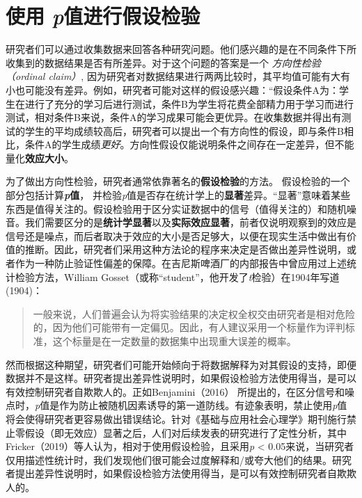 \documentclass[
  letterpaper,
  DIV=11,
  numbers=noendperiod]{scrreprt}
\begin{document}
\hypertarget{sec-pvalue}{%
\chapter{\texorpdfstring{使用
\emph{p}值进行假设检验}{使用 p值进行假设检验}}\label{sec-pvalue}}

研究者们可以通过收集数据来回答各种研究问题。他们感兴趣的是在不同条件下所收集到的数据结果是否有所差异。对于这个问题的答案是一个
\emph{方向性检验（ordinal claim）},
因为研究者对数据结果进行两两比较时，其平均值可能有大有小也可能没有差异。例如，研究者可能对这样的假设感兴趣：``假设条件A为：学生在进行了充分的学习后进行测试，条件B为学生将花费全部精力用于学习而进行测试，相对条件B来说，条件A的学习成果可能会更优异。在收集数据并得出有测试的学生的平均成绩较高后，研究者可以提出一个有方向性的假设，即与条件B相比，条件A的学生成绩\emph{更好}。方向性假设仅能说明条件之间存在一定差异，但不能量化\textbf{效应大小}。

为了做出方向性检验，研究者通常依靠著名的\textbf{假设检验}的方法。
假设检验的一个部分包括计算\textbf{\emph{p}值}，
并检验\emph{p}值是否存在统计学上的\textbf{显著}差异。``显著''意味着某些东西是值得关注的。假设检验用于区分实证数据中的信号（值得关注的）和随机噪音。我们需要区分的是\textbf{统计学显著}以及\textbf{实际效应显著}，前者仅说明观察到的效应是信号还是噪点，而后者取决于效应的大小是否足够大，以便在现实生活中做出有价值的推断。因此，研究者们采用这种方法论的程序来决定是否做出差异性说明，或者作为一种防止验证性偏差的保障。在吉尼斯啤酒厂的内部报告中曾应用过上述统计检验方法，William
Gosset（或称``student''，他开发了\emph{t}检验）在1904年写道 (1904)：

\begin{quote}
一般来说，人们普遍会认为将实验结果的决定权全权交由研究者是相对危险的，因为他们可能带有一定偏见。因此，有人建议采用一个标量作为评判标准，这个标量是在一定数量的数据集中出现重大误差的概率。
\end{quote}

然而根据这种期望，研究者们可能开始倾向于将数据解释为对其假设的支持，即便数据并不是这样。研究者提出差异性说明时，如果假设检验方法使用得当，是可以有效控制研究者自欺欺人的。正如Benjamini（2016）
所提出的，在区分信号和噪点时，\emph{p}值是作为防止被随机因素诱导的第一道防线。有迹象表明，禁止使用\emph{p}值将会使得研究者更容易做出错误结论。针对《基础与应用社会心理学》期刊施行禁止零假设（即无效应）显著之后，人们对后续发表的研究进行了定性分析，其中Fricker（2019）等人认为，相对于使用假设检验，且采用\emph{p}
\textless{}
0.05来说，当研究者仅用描述性统计时，我们发现他们很可能会过度解释和/或夸大他们的结果。研究者提出差异性说明时，如果假设检验方法使用得当，是可以有效控制研究者自欺欺人的。
\end{document}
